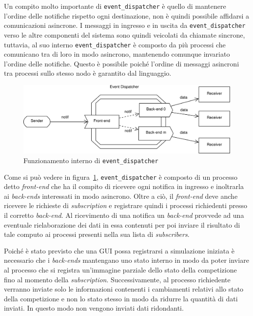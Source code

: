 Un compito molto importante di \texttt{event\_dispatcher} è quello di mantenere l'ordine delle notifiche rispetto ogni destinazione, non è quindi possibile affidarsi a comunicazioni asincrone.
I messaggi in ingresso e in uscita da \texttt{event\_dispatcher} verso le altre componenti del sistema sono quindi veicolati da chiamate sincrone, tuttavia, al suo interno \texttt{event\_dispatcher} è composto da più processi che comunicano tra di loro in modo asincrono, mantenendo comunque invariato l'ordine delle notifiche.
Questo è possibile poiché l'ordine di messaggi asincroni tra processi sullo stesso nodo è garantito dal linguaggio.

\begin{figure}
\includegraphics[width=\textwidth]{diagrammi/Dispatcher}
\caption{Funzionamento interno di \texttt{event\_dispatcher}}
\label{fig:dispatcher}
\end{figure}

Come si può vedere in figura~\ref{fig:dispatcher}, \texttt{event\_dispatcher} è composto di un processo detto \textit{front-end} che ha il compito di ricevere ogni notifica in ingresso e inoltrarla ai \textit{back-ends} interessati in modo asincrono. Oltre a ciò, il \textit{front-end} deve anche ricevere le richieste di \textit{subscription} e registrare quindi i processi richiedenti presso il corretto \textit{back-end}. Al ricevimento di una notifica un \textit{back-end} provvede ad una eventuale rielaborazione dei dati in essa contenuti per poi inviare il risultato di tale computo ai processi presenti nella sua lista di \textit{subscribers}.

Poiché è stato previsto che una GUI possa registrarsi a simulazione iniziata è necessario che i \textit{back-ends} mantengano uno stato interno in modo da poter inviare al processo che si registra un'immagine parziale dello stato della competizione fino al momento della \textit{subscription}. Successivamente, al processo richiedente verranno inviate solo le informazioni contenenti i cambiamenti relativi allo stato della competizione e non lo stato stesso in modo da ridurre la quantità di dati inviati. In questo modo non vengono inviati dati ridondanti.
